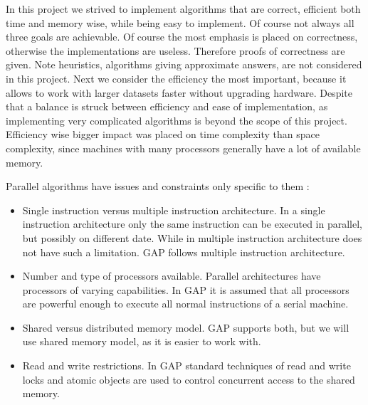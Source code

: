 \documentclass{report}
\theoremstyle{plain}
\theoremstyle{definition}
\theoremstyle{remark}
\numberwithin{definition}{chapter}
\numberwithin{example}{chapter}
\numberwithin{figure}{chapter}
\numberwithin{theorem}{chapter}
\numberwithin{lemma}{chapter}
\begin{document}
In this project we strived to implement algorithms that are correct, efficient both time and memory wise, while being easy to implement. Of course not always all three goals are achievable. Of course the most emphasis is placed on correctness, otherwise the implementations are useless. Therefore proofs of correctness are given. Note heuristics, algorithms giving approximate answers, are not considered in this project. Next we consider the efficiency the most important, because it allows to work with larger datasets faster without upgrading hardware. Despite that a balance is struck between efficiency and ease of implementation, as implementing very complicated algorithms is beyond the scope of this project. Efficiency wise bigger impact was placed on time complexity than space complexity, since machines with many processors generally have a lot of available memory.

Parallel algorithms have issues and constraints only specific to them \cite{berman1996fundamentals}:

\begin{itemize}
  \item Single instruction versus multiple instruction architecture. In a single instruction architecture only the same instruction can be executed in parallel, but possibly on different date. While in multiple instruction architecture does not have such a limitation. GAP follows multiple instruction architecture.
  \item Number and type of processors available. Parallel architectures have processors of varying capabilities. In GAP it is assumed that all processors are powerful enough to execute all normal instructions of a serial machine.
  \item Shared versus distributed memory model. GAP supports both, but we will use shared memory model, as it is easier to work with.
  \item Read and write restrictions. In GAP standard techniques of read and write locks and atomic objects are used to control concurrent access to the shared memory.
\end{itemize}
\end{document}
